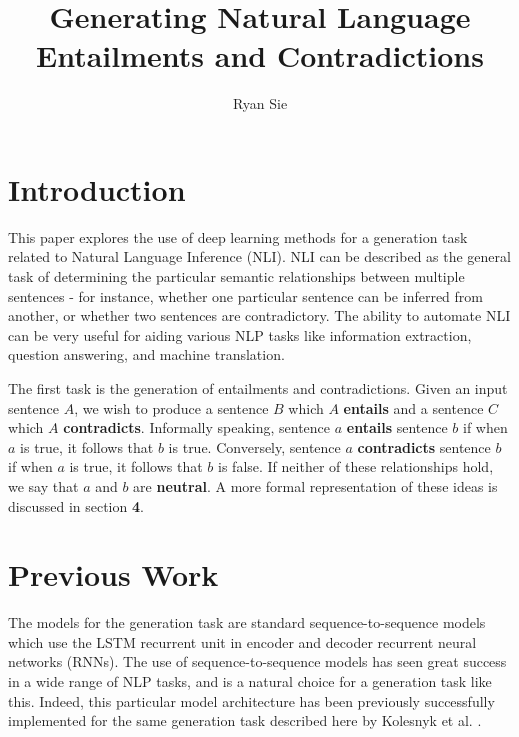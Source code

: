 \documentclass[a4paper, 12pt]{article}
\title{Generating Natural Language Entailments and Contradictions}
\date{}
\author{Ryan Sie}
\theoremstyle{definition}
\begin{document}
\maketitle

\section{Introduction}


This paper explores the use of deep learning methods for a generation task related to Natural Language Inference (NLI). NLI can be described as the general task of determining the particular semantic relationships between multiple sentences - for instance, whether one particular sentence can be inferred from another, or whether two sentences are contradictory. The ability to automate NLI can be very useful for aiding various NLP tasks like information extraction, question answering, and machine translation.

\bigskip

The first task is the generation of entailments and contradictions. Given an input sentence $A$, we wish to produce a sentence $B$ which $A$ \textbf{entails} and a sentence $C$ which $A$ \textbf{contradicts}. Informally speaking, sentence $a$ \textbf{entails} sentence $b$ if when $a$ is true, it follows that $b$ is true. Conversely, sentence $a$ \textbf{contradicts} sentence $b$ if when $a$ is true, it follows that $b$ is false. If neither of these relationships hold, we say that $a$ and $b$ are \textbf{neutral}. A more formal representation of these ideas is discussed in section \textbf{4}. 

%

\section{Previous Work}

The models for the generation task are standard sequence-to-sequence models \cite{seq-to-seq-sutskever} which use the LSTM \cite{lstm-schmid} recurrent unit in encoder and decoder recurrent neural networks (RNNs). The use of sequence-to-sequence models has seen great success in a wide range of NLP tasks, and is a natural choice for a generation task like this. Indeed, this particular model architecture has been previously successfully implemented for the same generation task described here by Kolesnyk et al. \cite{gen-nli-kolesnyk}.
\end{document}
